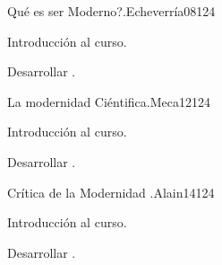 \begin{syllabus}
\begin{unit}{Qué es ser Moderno?.}{}{Echeverría08}{12}{4}
   \begin{topics}
      \item Introducción al curso.
   \end{topics}
   \begin{learningoutcomes}
      \item Desarrollar .
   \end{learningoutcomes}
\end{unit}

\begin{unit}{La modernidad Ciéntifica.}{}{Meca12}{12}{4}
   \begin{topics}
      \item Introducción al curso.
   \end{topics}
   \begin{learningoutcomes}
      \item Desarrollar .
   \end{learningoutcomes}
\end{unit}

\begin{unit}{Crítica de la Modernidad  .}{}{Alain14}{12}{4}
   \begin{topics}
      \item Introducción al curso.
   \end{topics}
   \begin{learningoutcomes}
      \item Desarrollar .
   \end{learningoutcomes}
\end{unit}






\begin{coursebibliography}
\end{coursebibliography}

\end{syllabus}
